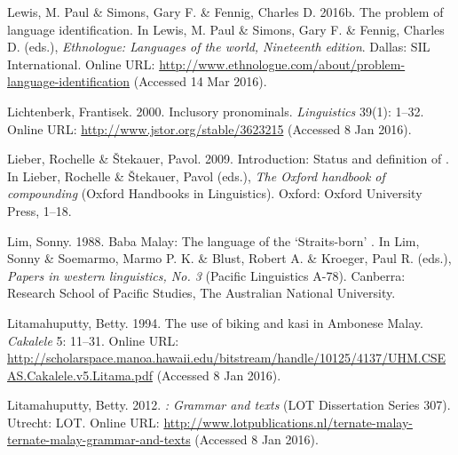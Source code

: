 \begin{styleCitaviBibliographyEntry}
Lewis, M. Paul \& Simons, Gary F. \& Fennig, Charles D. 2016b. The problem of language identification. In Lewis, M. Paul \& Simons, Gary F. \& Fennig, Charles D. (eds.), \textit{Ethnologue: Languages of the world, Nineteenth edition}. Dallas: SIL International. Online URL: \url{http://www.ethnologue.com/about/problem-language-identification} (Accessed 14 Mar 2016).
\end{styleCitaviBibliographyEntry}

\begin{styleCitaviBibliographyEntry}
Lichtenberk, Frantisek. 2000. Inclusory pronominals. \textit{ Linguistics} 39(1): 1–32. Online URL: \url{http://www.jstor.org/stable/3623215} (Accessed 8 Jan 2016).
\end{styleCitaviBibliographyEntry}

\begin{styleCitaviBibliographyEntry}
Lieber, Rochelle \& Štekauer, Pavol. 2009. Introduction: Status and definition of . In Lieber, Rochelle \& Štekauer, Pavol (eds.), \textit{The Oxford handbook of compounding} (Oxford Handbooks in Linguistics). Oxford: Oxford University Press, 1–18.
\end{styleCitaviBibliographyEntry}

\begin{styleCitaviBibliographyEntry}
Lim, Sonny. 1988. Baba Malay: The language of the ‘Straits-born’ . In Lim, Sonny \& Soemarmo, Marmo P. K. \& Blust, Robert A. \& Kroeger, Paul R. (eds.), \textit{Papers in western  linguistics, No. 3} (Pacific Linguistics A-78). Canberra: Research School of Pacific Studies, The Australian National University.
\end{styleCitaviBibliographyEntry}

\begin{styleCitaviBibliographyEntry}
Litamahuputty, Betty. 1994. The use of biking and kasi in Ambonese Malay. \textit{Cakalele} 5: 11–31. Online URL: \url{http://scholarspace.manoa.hawaii.edu/bitstream/handle/10125/4137/UHM.CSEAS.Cakalele.v5.Litama.pdf} (Accessed 8 Jan 2016).
\end{styleCitaviBibliographyEntry}

\begin{styleCitaviBibliographyEntry}
Litamahuputty, Betty. 2012. \textit{: Grammar and texts} (LOT Dissertation Series 307). Utrecht: LOT. Online URL: \url{http://www.lotpublications.nl/ternate-malay-ternate-malay-grammar-and-texts} (Accessed 8 Jan 2016).
\end{styleCitaviBibliographyEntry}

